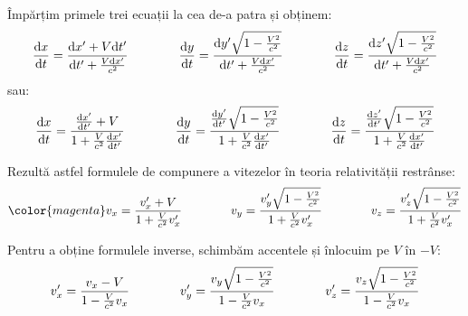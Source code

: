 Împărțim primele trei ecuații la cea de-a patra și obținem:
\begin{equation*}
    \begin{aligned}[t]
        \frac{\mathrm{d}x}{\mathrm{d}t} = \frac{\mathrm{d} x' + V\mathrm{d} t'}{\mathrm{d} t' + \frac{V\mathrm{d} x'}{c^2}}
    \end{aligned}\qquad\qquad
    \begin{aligned}[t]
        \frac{\mathrm{d}y}{\mathrm{d}t} = \frac{\mathrm{d} y'\sqrt{1 - \frac{V^2}{c^2}}}{\mathrm{d} t' + \frac{V\mathrm{d} x'}{c^2}}
    \end{aligned}\qquad\qquad
    \begin{aligned}[t]
        \frac{\mathrm{d}z}{\mathrm{d}t} = \frac{\mathrm{d} z'\sqrt{1 - \frac{V^2}{c^2}}}{\mathrm{d} t' + \frac{V\mathrm{d} x'}{c^2}}
    \end{aligned}
\end{equation*}
sau:
\begin{equation*}
    \begin{aligned}[t]
        \frac{\mathrm{d}x}{\mathrm{d}t} = \frac{\frac{\mathrm{d}x'}{\mathrm{d}t'} + V}{1 + \frac{V}{c^2}\frac{\mathrm{d}x'}{\mathrm{d}t'}}
    \end{aligned}\qquad\qquad
    \begin{aligned}[t]
        \frac{\mathrm{d}y}{\mathrm{d}t} = \frac{\frac{\mathrm{d}y'}{\mathrm{d}t'}\sqrt{1 - \frac{V^2}{c^2}}}{1 + \frac{V}{c^2}\frac{\mathrm{d}x'}{\mathrm{d}t'}}
    \end{aligned}\qquad\qquad
    \begin{aligned}[t]
        \frac{\mathrm{d}z}{\mathrm{d}t} = \frac{\frac{\mathrm{d}z'}{\mathrm{d}t'}\sqrt{1 - \frac{V^2}{c^2}}}{1 + \frac{V}{c^2}\frac{\mathrm{d}x'}{\mathrm{d}t'}}
    \end{aligned}
\end{equation*}

Rezultă astfel formulele de compunere a vitezelor în teoria relativității
restrânse:
\begin{equation*}
    \color{\accentcolor}
    \begin{aligned}[t]
        v_x = \frac{v_x' + V}{1 + \frac{V}{c^2}v_x'}
    \end{aligned}\qquad\qquad
    \begin{aligned}[t]
        v_y = \frac{v_y'\lorentzradical}{1 + \frac{V}{c^2}v_x'}
    \end{aligned}\qquad\qquad
    \begin{aligned}[t]
        v_z = \frac{v_z'\lorentzradical}{1 + \frac{V}{c^2}v_x'}
    \end{aligned}
\end{equation*}

Pentru a obține formulele inverse, schimbăm accentele și înlocuim pe $V$ în
$-V$:
\begin{equation*}
    \begin{aligned}[t]
        v_x' = \frac{v_x - V}{1 - \frac{V}{c^2}v_x}
    \end{aligned}\qquad\qquad
    \begin{aligned}[t]
        v_y' = \frac{v_y\sqrt{1 - \frac{V^2}{c^2}}}{1 - \frac{V}{c^2}v_x}
    \end{aligned}\qquad\qquad
    \begin{aligned}[t]
        v_z' = \frac{v_z\sqrt{1 - \frac{V^2}{c^2}}}{1 - \frac{V}{c^2}v_x}
    \end{aligned}
\end{equation*}

